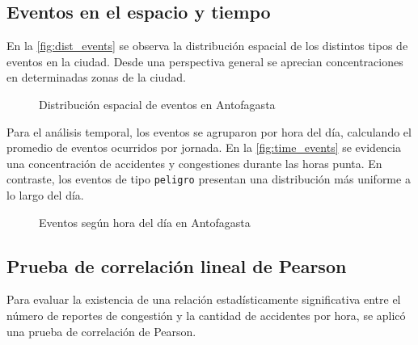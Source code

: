\documentclass[12pt]{article}
\begin{document}
\subsection{Eventos en el espacio y tiempo}

En la \autoref{fig:dist_events} se observa la distribución espacial de los distintos tipos de eventos en la ciudad. Desde una perspectiva general se aprecian concentraciones en determinadas zonas de la ciudad.

\begin{figure}[H]
    \centering
    \caption{Distribución espacial de eventos en Antofagasta}
    \label{fig:dist_events}
\end{figure}

Para el análisis temporal, los eventos se agruparon por hora del día, calculando el promedio de eventos ocurridos por jornada. En la \autoref{fig:time_events} se evidencia una concentración de accidentes y congestiones durante las horas punta. En contraste, los eventos de tipo \texttt{peligro} presentan una distribución más uniforme a lo largo del día.

\begin{figure}[H]
    \centering
    \newline
    \newline
    \newline
    \caption{Eventos según hora del día en Antofagasta}
    \label{fig:time_events}
\end{figure}

\subsection{Prueba de correlación lineal de Pearson}

Para evaluar la existencia de una relación estadísticamente significativa entre el número de reportes de congestión y la cantidad de accidentes por hora, se aplicó una prueba de correlación de Pearson.
\end{document}
